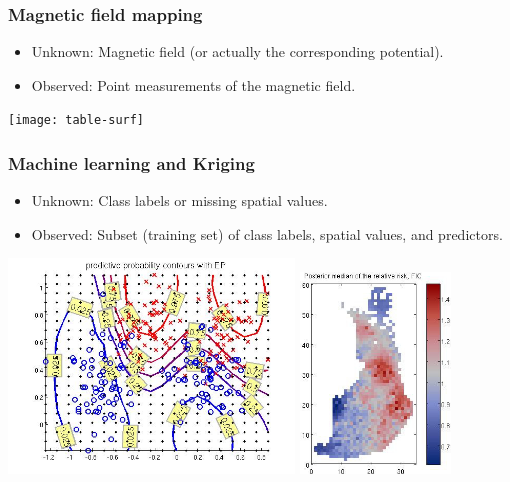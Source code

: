 \documentclass[first=dgreen,second=purple,presentation]{elecslides}
\begin{document}
\begin{frame}
 \frametitle{Magnetic field mapping}

\begin{itemize}[<+->]
\item \alert{Unknown}: Magnetic field (or actually the corresponding potential).
\item \alert{Observed}: Point measurements of the magnetic field.  
\end{itemize}
\begin{center}
\texttt{[image: table-surf]}
  
\end{center}
\end{frame}

\begin{frame}
 \frametitle{Machine learning and Kriging}

 \begin{itemize}[<+->]
 \item \alert{Unknown}: Class labels or missing spatial values.
 \item \alert{Observed}: Subset (training set) of class labels, spatial values, and predictors. 
 \end{itemize}
 \begin{center}
 \includegraphics[width=0.57\textwidth]{demo_classific2}
 \includegraphics[width=0.3\textwidth]{spatial1_pic1}
 \end{center}
\end{frame}
\end{document}
